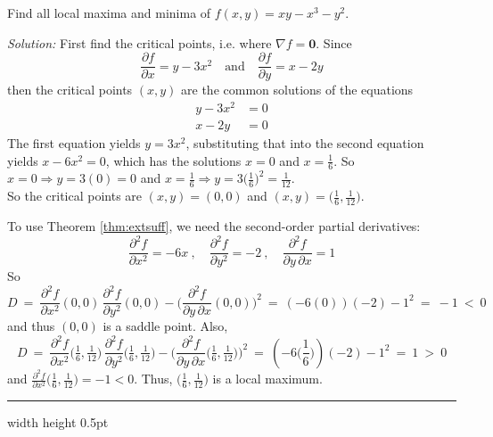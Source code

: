 \begin{exmp}
 Find all local maxima and minima of $f(x,y) = xy - x^3 - y^2$.\smallskip
 \par\noindent\emph{Solution:} First find the critical points, i.e. where $\nabla f = \mathbf{0}$. Since
 \begin{displaymath}
  \frac{\partial f}{\partial x} = y - 3x^2 \quad \text{and} \quad \frac{\partial f}{\partial y} = x - 2y
 \end{displaymath}
then the critical points $(x,y)$ are the common solutions of the equations
 \begin{align*}
  y - 3x^2 &= 0\\
  x - 2y &= 0
 \end{align*}
 The first equation yields $y = 3x^2$, substituting that into the second equation yields $x - 6x^2 = 0$, which
 has the solutions $x = 0$ and $x = \frac{1}{6}$. So $x = 0 \Rightarrow y = 3(0) = 0$ and $x = \frac{1}{6} \Rightarrow
 y = 3\bigl( \frac{1}{6} \bigr)^2 = \frac{1}{12}$.\\
 So the critical points are $(x,y) = (0,0)$ and $(x,y) = \bigl( \frac{1}{6}, \frac{1}{12} \bigr)$.
 
 To use Theorem \ref{thm:extsuff}, we need the second-order partial derivatives:
 \begin{displaymath}
  \frac{\partial^2 f}{\partial x^2} = -6x ~,\quad \frac{\partial^2 f}{\partial y^2} = -2 ~,\quad
  \dfrac{\partial^2 f}{\partial y \, \partial x} = 1
 \end{displaymath}
 So
 \begin{displaymath}
  D ~=~ \dfrac{\partial^2 f}{\partial x^2}(0,0) \, \dfrac{\partial^2 f}{\partial y^2}(0,0) -
 \biggl( \dfrac{\partial^2 f}{\partial y \, \partial x}(0,0) \biggr)^2 ~=~ (-6(0))(-2) - 1^2 ~=~ -1 ~<~ 0
 \end{displaymath}
 and thus $(0,0)$ is a saddle point.
 Also,
 \begin{displaymath}
  D ~=~ \dfrac{\partial^2 f}{\partial x^2}\bigl( \tfrac{1}{6}, \tfrac{1}{12} \bigr) \, 
  \dfrac{\partial^2 f}{\partial y^2}\bigl( \tfrac{1}{6}, \tfrac{1}{12} \bigr) -
 \biggl( \dfrac{\partial^2 f}{\partial y \, \partial x}\bigl( \tfrac{1}{6}, \tfrac{1}{12} \bigr) \biggr)^2 ~=~
 (-6\bigl(\frac{1}{6}\bigr))(-2) - 1^2 ~=~ 1 ~>~ 0
 \end{displaymath}
 and $\frac{\partial^2 f}{\partial x^2}\bigl( \frac{1}{6}, \frac{1}{12} \bigr) = -1 < 0$.
 Thus, $\bigl( \frac{1}{6}, \frac{1}{12} \bigr)$ is a local maximum.
 \end{exmp}
\hrule width \textwidth height 0.5pt
